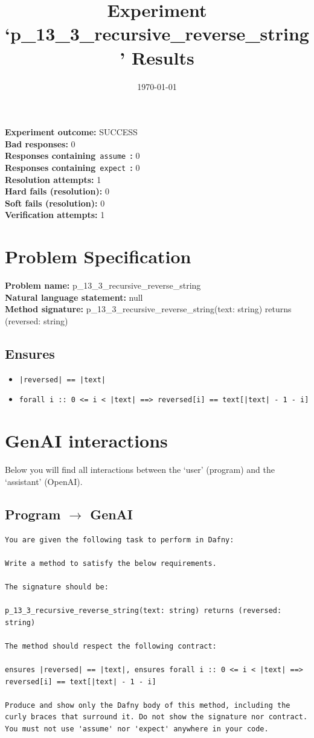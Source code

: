 \documentclass{article}
\begin{document}
\title{Experiment `p\_13\_3\_recursive\_reverse\_string' Results}
\author{\today}
\date{}
\maketitle
\textbf{Experiment outcome: }SUCCESS
\\\textbf{Bad responses: }0
\\\textbf{Responses containing}~\texttt{assume}~\textbf{: }0
\\\textbf{Responses containing}~\texttt{expect}~\textbf{: }0
\\\textbf{Resolution attempts: }1
\\\textbf{Hard fails (resolution): }0
\\\textbf{Soft fails (resolution): }0
\\\textbf{Verification attempts: }1
\section*{Problem Specification}
\textbf{Problem name: }p\_13\_3\_recursive\_reverse\_string
\\\textbf{Natural language statement: }null
\\\textbf{Method signature: }p\_13\_3\_recursive\_reverse\_string(text: string) returns (reversed: string)
\subsection*{Ensures}
\begin{itemize}
\item \texttt{|reversed| == |text|}
\item \texttt{forall i :: 0 <= i < |text| ==> reversed[i] == text[|text| - 1 - i]}
\end{itemize}
\clearpage
\section*{GenAI interactions}
Below you will find all interactions between the `user' (program) and the `assistant' (OpenAI).
\subsection*{Program $\rightarrow$ GenAI}
\begin{lstlisting}
You are given the following task to perform in Dafny:

Write a method to satisfy the below requirements.

The signature should be:

p_13_3_recursive_reverse_string(text: string) returns (reversed: string)

The method should respect the following contract:

ensures |reversed| == |text|, ensures forall i :: 0 <= i < |text| ==> reversed[i] == text[|text| - 1 - i]

Produce and show only the Dafny body of this method, including the curly braces that surround it. Do not show the signature nor contract. You must not use 'assume' nor 'expect' anywhere in your code.
\end{lstlisting}
\end{document}
